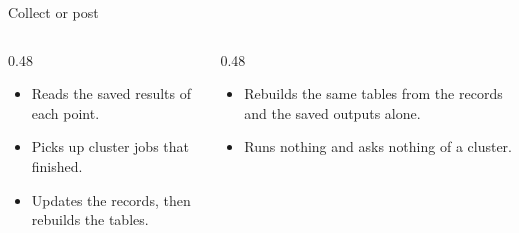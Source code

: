 \begin{frame}{Collect or post}
\begin{columns}[T]
\begin{column}{0.48\textwidth}
\begin{block}{}
\begin{itemize}\small
  \item Reads the saved results of each point.
  \item Picks up cluster jobs that finished.
  \item Updates the records, then rebuilds the tables.
\end{itemize}
\end{block}
\end{column}
\begin{column}{0.48\textwidth}
\begin{block}{}
\begin{itemize}\small
  \item Rebuilds the same tables from the records and the saved outputs
        alone.
  \item Runs nothing and asks nothing of a cluster.
\end{itemize}
\end{block}
\end{column}
\end{columns}
\vspace{1mm}
\end{frame}

